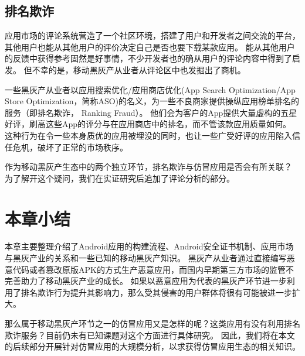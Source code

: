 \subsection{排名欺诈}
应用市场的评论系统营造了一个社区环境，搭建了用户和开发者之间交流的平台，其他用户也能从其他用户的评价决定自己是否也要下载某款应用。
能从其他用户的反馈中获得参考固然是好事情，不少开发者也的确从用户的评论内容中得到了启发。
但不幸的是，移动黑灰产从业者从评论区中也发掘出了商机。

一些黑灰产从业者以应用搜索优化/应用商店优化(App Search Optimization/App Store Optimization，简称ASO)的名义，为一些不良商家提供操纵应用榜单排名的服务（即排名欺诈， Ranking Fraud）。
他们会为客户的App提供大量虚构的五星好评，刷高这些App的评分与在应用商店中的排名，而不管该款应用质量如何。
这种行为在令一些本身质优的应用被埋没的同时，也让一些广受好评的应用陷入信任危机，破坏了正常的市场秩序。

作为移动黑灰产生态中的两个独立环节，排名欺诈与仿冒应用是否会有所关联？
为了解开这个疑问，我们在实证研究后追加了评论分析的部分。

\section{本章小结}
本章主要整理介绍了Android应用的构建流程、Android安全证书机制、应用市场与黑灰产业的关系和一些已知的移动黑灰产知识。
黑灰产从业者通过直接编写恶意代码或者篡改原版APK的方式生产恶意应用，而国内早期第三方市场的监管不完善助力了移动黑灰产业的成长。
如果以恶意应用为代表的黑灰产环节进一步利用了排名欺诈行为提升其影响力，那么受其侵害的用户群体将很有可能被进一步扩大。

那么属于移动黑灰产环节之一的仿冒应用又是怎样的呢？这类应用有没有利用排名欺诈服务？目前仍未有已知课题对这个方面进行具体研究。
因此，我们将在本文的后续部分开展针对仿冒应用的大规模分析，以求获得仿冒应用生态的相关知识。
